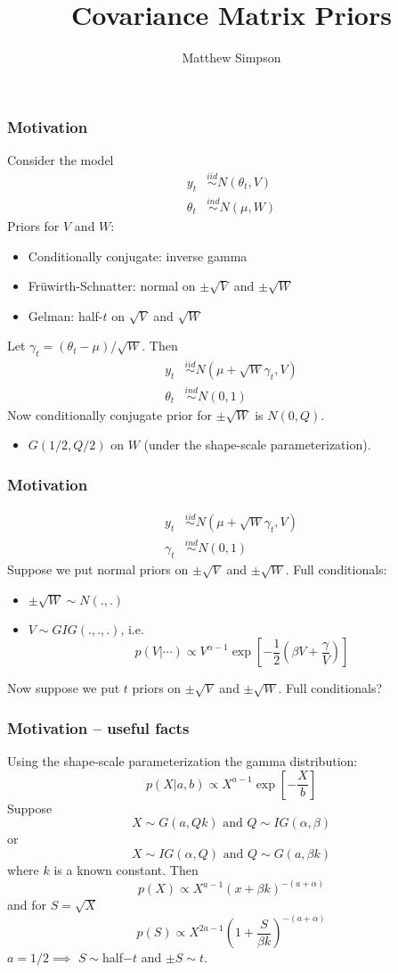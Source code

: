 \documentclass[xcolor=dvipsnames]{beamer}
\title[Cov Mat Priors]{Covariance Matrix Priors}
\author[Matt Simpson]{Matthew Simpson}
\date{}
\institute[]{Departments of Statistics and Economics, Iowa State University}
\begin{document}
\begin{frame}
\titlepage
\end{frame}

\begin{frame}
\frametitle{Motivation}
Consider the model
\begin{align*}
 y_t &\stackrel{iid}{\sim} N(\theta_t, V)\\
\theta_t &\stackrel{ind}{\sim} N(\mu,W)
\end{align*}
\pause
Priors for $V$ and $W$:
\begin{itemize}
\item Conditionally conjugate: inverse gamma
\item Fr{\"u}wirth-Schnatter: normal on $\pm\sqrt{V}$ and $\pm\sqrt{W}$
\item Gelman: half-$t$ on $\sqrt{V}$ and $\sqrt{W}$
\end{itemize}
\pause
Let $\gamma_t=(\theta_t-\mu)/\sqrt{W}$. Then
\begin{align*}
 y_t &\stackrel{iid}{\sim} N(\mu + \sqrt{W}\gamma_t, V)\\
\theta_t &\stackrel{ind}{\sim} N(0,1)
\end{align*}
\pause
Now conditionally conjugate prior for $\pm \sqrt{W}$ is $N(0,Q)$.
\begin{itemize}
\item[] $G(1/2, Q/2)$ on $W$ (under the shape-scale parameterization).
\end{itemize}
\end{frame}

\begin{frame}
\frametitle{Motivation}
\begin{align*}
 y_t &\stackrel{iid}{\sim} N(\mu + \sqrt{W}\gamma_t, V)\\
\gamma_t &\stackrel{ind}{\sim} N(0,1)
\end{align*}
Suppose we put normal priors on $\pm\sqrt{V}$ and $\pm\sqrt{W}$.
\pause
Full conditionals:
\begin{itemize}
\item $\pm\sqrt{W}\sim N(.,.)$
\item $V\sim GIG(.,.,.)$, i.e. 
\[
p(V|\cdots)\propto V^{\alpha -1}\exp\left[-\frac{1}{2}\left(\beta V + \frac{\gamma}{V}\right)\right]
\]
\end{itemize}
\pause
Now suppose we put $t$ priors on $\pm\sqrt{V}$ and $\pm\sqrt{W}$. Full conditionals?
\end{frame}

\begin{frame}
\frametitle{Motivation -- useful facts}
Using the shape-scale parameterization the gamma distribution:
\[
p(X|a,b) \propto X^{a-1}\exp\left[-\frac{X}{b}\right]
\]
Suppose 
\[
X\sim G(a,Qk) \mbox{ and } Q\sim IG(\alpha,\beta)
\]
or
\[
X\sim IG(\alpha, Q) \mbox{ and } Q\sim G(a,\beta k)
\]
where $k$ is a known constant. \pause Then
\[
p(X) \propto X^{a-1}(x + \beta k)^{-(a + \alpha)}
\]
\pause
and for $S=\sqrt{X}$
\[
p(S) \propto X^{2a-1}\left(1 + \frac{S}{\beta k}\right)^{-(a + \alpha)}
\]
$a=1/2 \implies $ $S\sim $half$-t$ and $\pm S \sim t$.
\end{frame}
\end{document}
